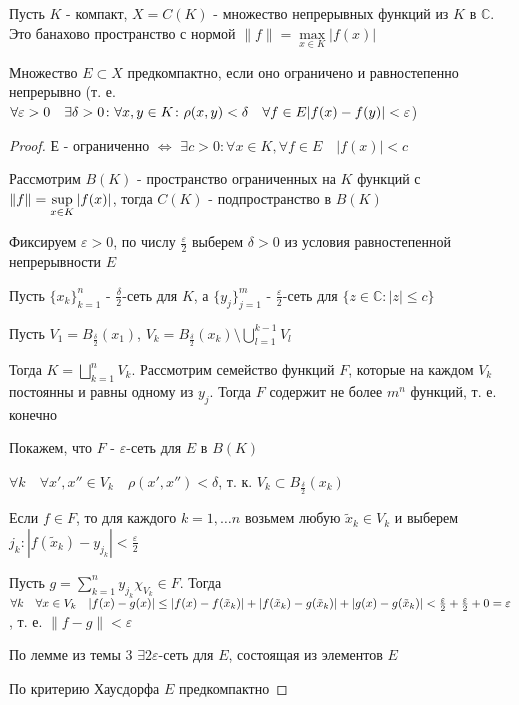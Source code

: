 \documentclass[a4paper,12pt]{report}
\newcommand*{\hm}[1]{#1\nobreak\discretionary{}%
            {\hbox{$\mathsurround=0pt #1$}}{}}
\begin{document}
\begin{lem}
Пусть $K$ - компакт, $X=C(K)$ - множество непрерывных функций из $K$ в $\mathbb C$. Это банахово пространство с нормой $\|f\|=\max\limits_{x\in K}|f(x)|$

Множество $E\subset X$ предкомпактно, если оно ограничено и равностепенно непрерывно (т. е. $\forall\varepsilon>0\quad\exists\delta>0\colon\forall x,y\in K\colon\rho(x,y)<\delta\quad\forall {f\in E} \\|f(x)-f(y)|<\varepsilon$)
\end{lem}
\begin{proof}
$Е$ - ограниченно $\Leftrightarrow$ $\exists c>0\colon\forall x\in K,\forall f\in E\quad|f(x)|<c$

Рассмотрим $B(K)$ - пространство ограниченных на $K$ функций с $\|f\|\hm=\sup\limits_{x\in K}|f(x)|$, тогда $C(K)$ - подпространство в $B(K)$

Фиксируем $\varepsilon>0$, по числу $\frac\varepsilon2$ выберем $\delta>0$ из условия равностепенной непрерывности $E$

Пусть $\{x_k\}_{k=1}^n$ - $\frac\delta2$-сеть для $K$, а $\{y_j\}_{j=1}^m$ - $\frac\varepsilon2$-сеть для $\{z\in\mathbb C\colon|z|\le c\}$

Пусть $V_1=B_{\frac\delta2}(x_1)$, $V_k=B_{\frac\delta2}(x_k)\setminus\bigcup\limits_{l=1}^{k-1}V_l$

Тогда $K=\bigsqcup\limits_{k=1}^n V_k$. Рассмотрим семейство функций $F$, которые на каждом $V_k$ постоянны и равны одному из $y_j$. Тогда $F$ содержит не более $m^n$ функций, т. е. конечно

Покажем, что $F$ - $\varepsilon$-сеть для $E$ в $B(K)$

$\forall k\quad\forall x',x''\in V_k\quad\rho(x',x'')<\delta$, т. к. $V_k\subset B_{\frac\delta2}(x_k)$

Если $f\in F$, то для каждого $k=1,\ldots n$ возьмем любую $\tilde x_k\in V_k$ и выберем $j_k\colon|f(\tilde x_k)-y_{j_k}|<\frac\varepsilon2$

Пусть $g=\sum\limits_{k=1}^n y_{j_k}\chi_{V_k}\in F$. Тогда $\forall k\quad\forall x\in V_k\quad|f(x)-g(x)|\le|f(x)\hm-f(\tilde x_k)|+|f(\tilde x_k)-g(\tilde x_k)|+|g(x)-g(\tilde x_k)|<\frac\varepsilon2+\frac\varepsilon2+0=\varepsilon$, т. е. $\|f-g\|<\varepsilon$

По лемме из темы 3 $\exists 2\varepsilon$-сеть для $E$, состоящая из элементов $E$ 

По критерию Хаусдорфа $E$ предкомпактно
\end{proof}
 
\end{document}
